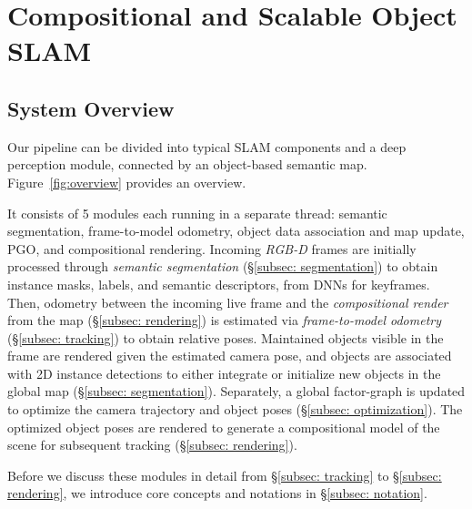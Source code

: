 \section{Compositional and Scalable Object SLAM} \label{sec: methodology}

 \subsection{System Overview}
Our pipeline can be divided into typical SLAM components and a deep perception module, connected by an object-based semantic map. Figure~\ref{fig:overview} provides an overview.

%
It consists of 5 modules each running in a separate thread: semantic segmentation, frame-to-model odometry, object data association and map update, PGO, and compositional rendering.
%
Incoming \textit{RGB-D} frames are initially processed through  \textit{semantic segmentation} (\S\ref{subsec: segmentation})  to obtain instance masks, labels, and semantic descriptors, from DNNs for keyframes.
%
Then, odometry between the incoming live frame and the \textit{compositional render} from the map (\S\ref{subsec: rendering}) is estimated via \textit{frame-to-model odometry} (\S\ref{subsec: tracking}) to obtain relative poses.
%
Maintained objects visible in the frame are rendered given the estimated camera pose, and objects are associated with 2D instance detections to either integrate or initialize new objects in the global map (\S\ref{subsec: segmentation}).
%
Separately, a global factor-graph is updated to optimize the camera trajectory and object poses (\S\ref{subsec: optimization}). The optimized object poses are rendered to generate a compositional model of the scene for subsequent tracking (\S\ref{subsec: rendering}).

Before we discuss these modules in detail from \S\ref{subsec: tracking} to \S\ref{subsec: rendering}, we introduce core concepts and notations in \S\ref{subsec: notation}.

